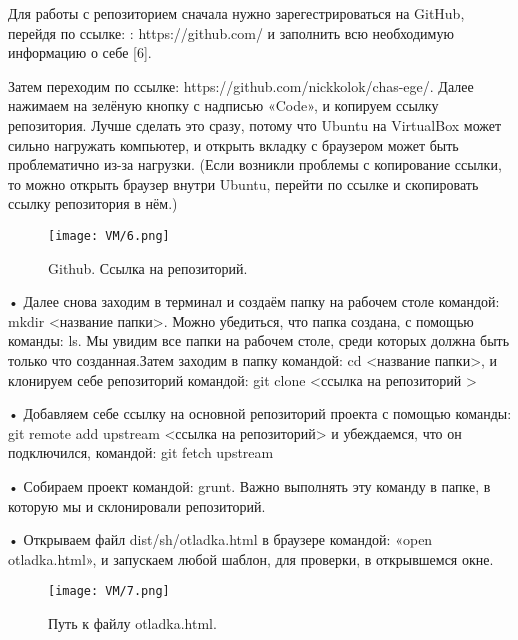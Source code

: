 Для работы с репозиторием сначала нужно зарегестрироваться на GitHub, перейдя по ссылке: : https://github.com/ и заполнить всю необходимую информацию о себе [6].

Затем переходим по ссылке: https://github.com/nickkolok/chas-ege/. Далее нажимаем на зелёную кнопку с надписью «Code», и копируем ссылку репозитория. Лучше сделать это сразу, потому что Ubuntu на VirtualBox может сильно нагружать компьютер, и открыть вкладку с браузером может быть проблематично из-за нагрузки. (Если возникли проблемы с копирование ссылки, то можно открыть браузер внутри Ubuntu, перейти по ссылке и скопировать ссылку репозитория в нём.)

\begin{figure}[h]
		\centering
		\texttt{[image: VM/6.png]}
\caption{Github. Ссылка на репозиторий.}
\label{ris:image}
\end{figure}

• Далее снова заходим в терминал и создаём папку на рабочем столе командой: mkdir <название папки>. Можно убедиться, что папка создана, с помощью команды: ls. Мы увидим все папки на рабочем столе, среди которых должна быть только что созданная.Затем заходим в папку командой: cd <название папки>, и клонируем себе репозиторий командой: git clone <ссылка на репозиторий >

• Добавляем себе ссылку на основной репозиторий проекта с помощью команды: git remote add upstream <ссылка на репозиторий> и убеждаемся, что он подключился, командой: git fetch upstream 

• Собираем проект командой: grunt. Важно выполнять эту команду в папке, в которую мы и склонировали репозиторий.

• Открываем файл dist/sh/otladka.html в браузере командой: «open otladka.html», и запускаем любой шаблон, для проверки, в открывшемся окне.


\begin{figure}[h]
		\centering
		\texttt{[image: VM/7.png]}
\caption{Путь к файлу otladka.html.}
\label{ris:image}
\end{figure}
